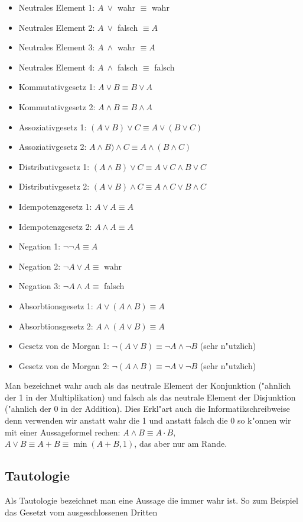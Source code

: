 \begin{itemize}
\item Neutrales Element 1: $A \ \lor $ wahr $\equiv$ wahr
\item Neutrales Element 2: $A \ \lor $ falsch $\equiv A$
\item Neutrales Element 3: $A \ \land $ wahr $\equiv A$
\item Neutrales Element 4: $A \ \land $ falsch $\equiv$ falsch
\item Kommutativgesetz 1: $A \lor B \equiv B \lor A$
\item Kommutativgesetz 2: $A \land B \equiv B \land A$
\item Assoziativgesetz 1: $(A \lor B) \lor C \equiv A \lor (B \lor C)$
\item Assoziativgesetz 2: $A \land B) \land C \equiv A \land (B \land C)$
\item Distributivgesetz 1: $(A \land B) \lor C \equiv A \lor C \land  B \lor C$
\item Distributivgesetz 2: $(A \lor B) \land C \equiv A \land C \lor B \land C$
\item Idempotenzgesetz 1: $A \lor A \equiv A$
\item Idempotenzgesetz 2: $A \land A \equiv A$
\item Negation 1: $\neg \neg A \equiv A$
\item Negation 2: $\neg A \lor A \equiv $ wahr
\item Negation 3: $\neg A \land A \equiv$ falsch
\item Absorbtionsgesetz 1: $A \lor (A \land B) \equiv A$
\item Absorbtionsgesetz 2: $A \land (A \lor B) \equiv A$
\item Gesetz von de Morgan 1: $\neg (A \lor B) \equiv \neg A \land \neg B$ (sehr n"utzlich)
\item Gesetz von de Morgan 2: $\neg (A \land B) \equiv \neg A \lor \neg B$ (sehr n"utzlich)
\end{itemize}
Man bezeichnet wahr auch als das neutrale Element der Konjunktion ("ahnlich der 1 in der Multiplikation) und falsch als das neutrale Element der Disjunktion ("ahnlich der 0 in der Addition). Dies Erkl"art auch die Informatikschreibweise denn verwenden wir anstatt wahr die 1 und anstatt falsch die 0 so k"onnen wir mit einer Aussageformel rechen: $A \land B \equiv A \cdot B$, $A \lor B \equiv A + B \equiv \min(A + B, 1)$, das aber nur am Rande.

\subsection{Tautologie}
Als Tautologie bezeichnet man eine Aussage die immer wahr ist. So zum Beispiel das Gesetzt vom ausgeschlossenen Dritten

